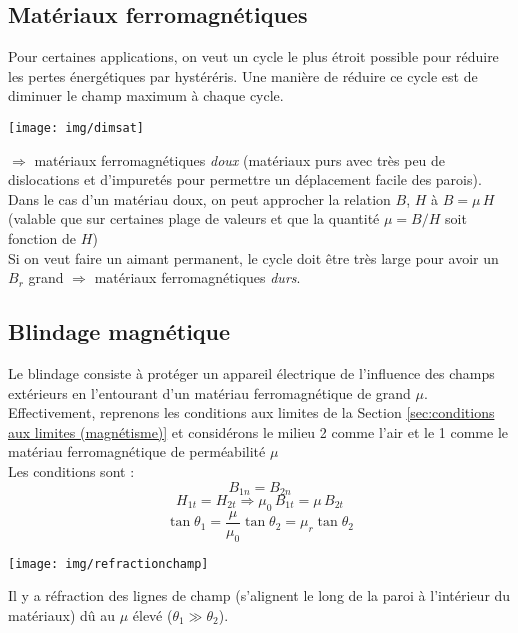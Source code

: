\documentclass[11pt, a4paper, openany]{book}
\begin{document}
		\subsection{Matériaux ferromagnétiques}
		Pour certaines applications, on veut un cycle le plus étroit possible pour réduire les pertes énergétiques par hystéréris. Une manière de réduire ce cycle est de diminuer le champ maximum à chaque cycle. \begin{center}
			\texttt{[image: img/dimsat]}
		\end{center}
		$\Rightarrow$ matériaux ferromagnétiques \textit{doux} (matériaux purs avec très peu de dislocations et d'impuretés pour permettre un déplacement facile des parois).\\
		Dans le cas d'un matériau doux, on peut approcher la relation $B$, $H$ à $B=\mu\,H$ (valable que sur certaines plage de valeurs et que la quantité $\mu=B/H$ soit fonction de $H$)\\
		
		Si on veut faire un aimant permanent, le cycle doit être très large pour avoir un $B_r$ grand $\Rightarrow$ matériaux ferromagnétiques \textit{durs}. 
		\subsection{Blindage magnétique}
		Le blindage consiste à protéger un appareil électrique de l'influence des champs extérieurs en l'entourant d'un matériau ferromagnétique de grand $\mu$.\\
		
		Effectivement, reprenons les conditions aux limites de la Section \ref{sec:conditions aux limites (magnétisme)} et considérons le milieu 2 comme l'air et le 1 comme le matériau ferromagnétique de perméabilité $\mu$\\
		Les conditions sont :$$
		B_{1n} =B_{2n}$$\begin{equation}
		H_{1t} =H_{2t}\Rightarrow \mu_0\,B_{1t}=\mu\,B_{2t}\end{equation}$$
		\tan\theta_1 =\frac{\mu}{\mu_0}\tan\theta_2=\mu_r\tan\theta_2$$
		\begin{center}
			\texttt{[image: img/refractionchamp]}
		\end{center}
		Il y a réfraction des lignes de champ (s'alignent le long de la paroi à l'intérieur du matériaux) dû au $\mu$ élevé ($\theta_1\gg\theta_2$).
\end{document}
